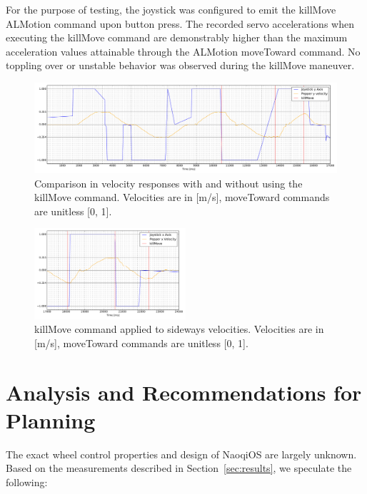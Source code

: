 \documentclass[11pt,a4paper]{article}
\begin{document}
For the purpose of testing, the joystick was configured to emit the killMove ALMotion command upon button press. The recorded servo accelerations when executing the killMove command are demonstrably higher than the maximum acceleration values attainable through the ALMotion moveToward command. No toppling over or unstable behavior was observed during the killMove maneuver.


\begin{figure}[h]
\centering
{}
\includegraphics[width=1\textwidth]{figures/kill_move_forwardback_pepper_performance.pdf}
\caption{Comparison in velocity responses with and without using the killMove command. Velocities are in [m/s], moveToward commands are unitless [0, 1].} 
\label{fig:killmove_forwardback_performance}
\end{figure}

\begin{figure}[h]
\centering
{}
\includegraphics[width=0.5\textwidth]{figures/kill_move_side_pepper_performance.pdf}
\caption{killMove command applied to sideways velocities. Velocities are in [m/s], moveToward commands are unitless [0, 1].} 
\label{fig:killmove_side_performance}
\end{figure}

\section{Analysis and Recommendations for Planning}

The exact wheel control properties and design of NaoqiOS are largely unknown. Based on the measurements described in Section~\ref{sec:results}, we speculate the following:
\end{document}
